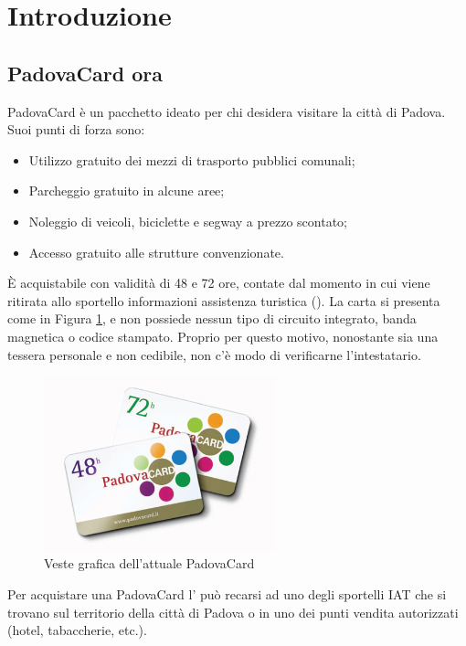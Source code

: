\section{Introduzione}

\subsection{PadovaCard ora}
PadovaCard è un pacchetto ideato per chi desidera visitare la città di Padova.  Suoi punti di forza sono:
\begin{itemize}
\item Utilizzo gratuito dei mezzi di trasporto pubblici comunali;
\item Parcheggio gratuito in alcune aree;
\item Noleggio di veicoli, biciclette e segway a prezzo scontato;
\item Accesso gratuito alle strutture convenzionate.
\end{itemize}
\`E acquistabile con validità di 48 e 72 ore, contate dal momento in cui viene ritirata allo sportello informazioni assistenza turistica ().
La carta si presenta come in Figura \ref{immaginePadovaCard}, e non possiede nessun tipo di circuito integrato, banda magnetica o codice stampato. 
Proprio per questo motivo, nonostante sia una tessera personale e non cedibile, non c'è modo di verificarne l'intestatario.\\

\begin{figure}[H]
\centering
\includegraphics[width=0.6\textwidth]{images/padovacard.jpg}
\caption{Veste grafica dell'attuale PadovaCard}\label{immaginePadovaCard}
\end{figure}

Per acquistare una PadovaCard l' può recarsi ad uno degli sportelli IAT che si trovano sul territorio della città di Padova o in uno dei punti vendita autorizzati (hotel, tabaccherie, etc.).\\

